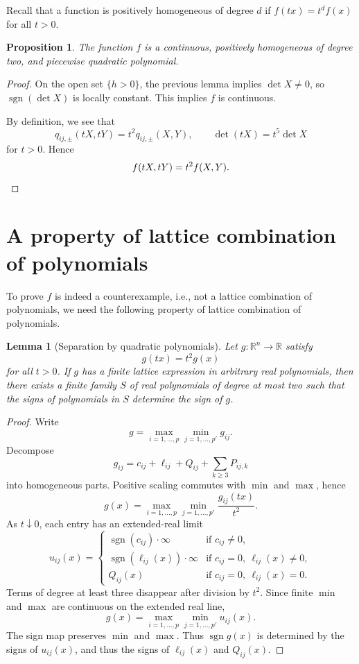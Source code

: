 \documentclass[11pt]{amsart}
\newtheorem{proposition}[theorem]{Proposition}
\newtheorem{lemma}[theorem]{Lemma}
\theoremstyle{remark}
\DeclareMathOperator{\sgn}{sgn}
\begin{document}
Recall that a function is positively homogeneous of degree $d$ if $f(t x) = t^d f(x)$ for all $t > 0$.
\begin{proposition}
The function $f$ is a continuous, positively homogeneous of degree two, and piecewise quadratic polynomial.
\end{proposition}
\begin{proof}
On the open set $\{h>0\}$, the previous lemma implies $\det X\ne0$, so $\sgn(\det X)$ is locally constant. This implies $f$ is  continuous.

By definition, we see that
\[
q_{ij,\pm}(tX,tY)=t^2q_{ij,\pm}(X,Y),
\qquad
\det(tX)=t^5\det X
\]
for $t>0$. Hence
\[
f(tX,tY)=t^2f(X,Y). \qedhere
\]
\end{proof}

\section{A property of lattice combination of polynomials}

To prove $f$ is indeed a counterexample, i.e., not a lattice combination of polynomials, we need the following property of lattice combination of polynomials.

\begin{lemma}[Separation by quadratic polynomials]
Let $g:\mathbb R^n\to\mathbb R$ satisfy
\[
g(tx)=t^2g(x)
\]
for all $t>0$. 
If $g$ has a finite lattice expression in arbitrary real polynomials, then there exists a finite family $S$ of real polynomials of degree at most two such that the signs of polynomials in $S$ determine the sign of $g$.
\end{lemma}
\begin{proof}
Write
\[
g=\max_{i=1,\dots,p}\min_{j=1,\dots,p'} g_{ij}.
\]
Decompose
\[
g_{ij}=c_{ij}+\ell_{ij}+Q_{ij}+\sum_{k\ge3}P_{ij,k}
\]
into homogeneous parts. Positive scaling commutes with $\min$ and $\max$, hence
\[
g(x)=\max_{i=1,\dots,p}\min_{j=1,\dots,p'} \frac{g_{ij}(tx)}{t^2}.
\]
As $t\downarrow0$, each entry has an extended-real limit
\[
u_{ij}(x)=
\begin{cases}
\sgn(c_{ij})\cdot\infty&\text{if } c_{ij}\ne0,\\
\sgn(\ell_{ij}(x))\cdot\infty&\text{if } c_{ij}=0,\ \ell_{ij}(x)\ne0,\\
Q_{ij}(x)&\text{if } c_{ij}=0,\ \ell_{ij}(x)=0.
\end{cases}
\]
Terms of degree at least three disappear after division by $t^2$. Since finite $\min$ and $\max$ are continuous on the extended real line,
\[
g(x)=\max_{i=1,\dots,p}\min_{j=1,\dots,p'} u_{ij}(x).
\]
The sign map preserves $\min$ and $\max$. Thus $\sgn g(x)$ is determined by the signs of $u_{ij}(x)$, and thus the signs of $\ell_{ij}(x)$ and $Q_{ij}(x)$.
\end{proof}
\end{document}
